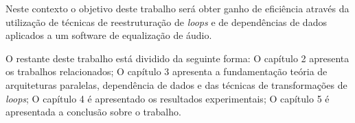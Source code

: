 Neste contexto o objetivo deste trabalho será obter ganho de eficiência através da 
utilização de técnicas de reestruturação de \textit{loops} e de dependências de 
dados aplicados a um software de equalização de áudio.

O restante deste trabalho está dividido da seguinte forma: O capítulo 2
  apresenta os trabalhos relacionados; O capítulo 3
  apresenta a fundamentação teória de arquiteturas paralelas, dependência de
  dados e das técnicas de transformações de \textit{loops}; O capítulo 4 é  
  apresentado os resultados experimentais; O capítulo 5 é apresentada a 
  conclusão sobre o trabalho.
